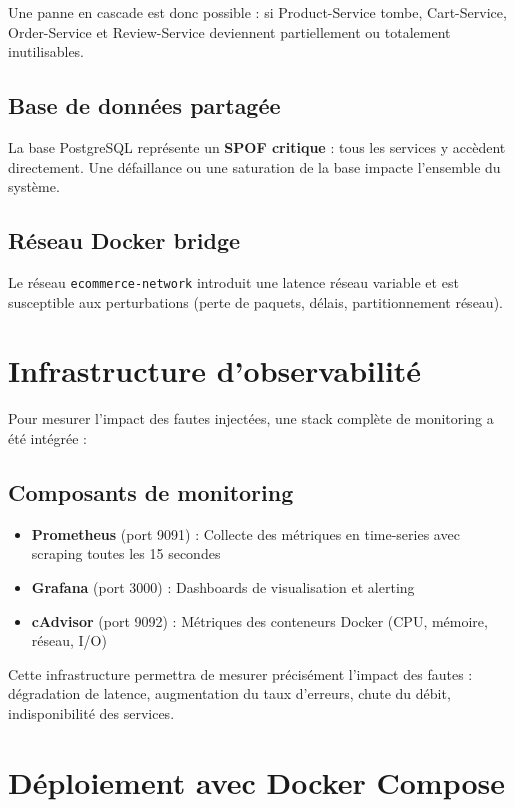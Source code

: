 Une panne en cascade est donc possible : si Product-Service tombe, Cart-Service, Order-Service et Review-Service deviennent partiellement ou totalement inutilisables.

\subsection{Base de données partagée}

La base PostgreSQL représente un \textbf{SPOF critique} : tous les services y accèdent directement. Une défaillance ou une saturation de la base impacte l'ensemble du système.

\subsection{Réseau Docker bridge}

Le réseau \texttt{ecommerce-network} introduit une latence réseau variable et est susceptible aux perturbations (perte de paquets, délais, partitionnement réseau).

\section{Infrastructure d'observabilité}

Pour mesurer l'impact des fautes injectées, une stack complète de monitoring a été intégrée :

\subsection{Composants de monitoring}

\begin{itemize}
    \item \textbf{Prometheus} (port 9091) : Collecte des métriques en time-series avec scraping toutes les 15 secondes
    \item \textbf{Grafana} (port 3000) : Dashboards de visualisation et alerting
    \item \textbf{cAdvisor} (port 9092) : Métriques des conteneurs Docker (CPU, mémoire, réseau, I/O)
\end{itemize}

Cette infrastructure permettra de mesurer précisément l'impact des fautes : dégradation de latence, augmentation du taux d'erreurs, chute du débit, indisponibilité des services.

\section{Déploiement avec Docker Compose}

